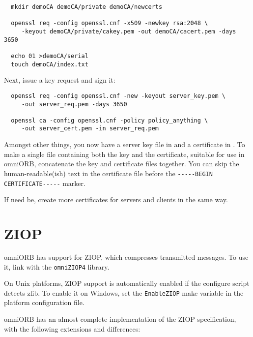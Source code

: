\documentclass[11pt,oneside,a4paper]{book}
\newcommand{\code}[1]{\texttt{#1}}
\begin{document}
\begin{verbatim}
  mkdir demoCA demoCA/private demoCA/newcerts

  openssl req -config openssl.cnf -x509 -newkey rsa:2048 \
     -keyout demoCA/private/cakey.pem -out demoCA/cacert.pem -days 3650

  echo 01 >demoCA/serial
  touch demoCA/index.txt
\end{verbatim}

\noindent Next, issue a key request and sign it:

\begin{verbatim}
  openssl req -config openssl.cnf -new -keyout server_key.pem \
     -out server_req.pem -days 3650

  openssl ca -config openssl.cnf -policy policy_anything \
     -out server_cert.pem -in server_req.pem 
\end{verbatim}

\noindent Amongst other things, you now have a server key file in
 and a certificate in . To
make a single file containing both the key and the certificate,
suitable for use in omniORB, concatenate the key and certificate files
together.  You can skip the human-readable(ish) text in the
certificate file before the \verb|-----BEGIN CERTIFICATE-----| marker.

If need be, create more certificates for servers and clients in the
same way.


\section{ZIOP}

omniORB has support for ZIOP, which compresses transmitted
messages. To use it, link with the \code{omniZIOP4} library.

On Unix platforms, ZIOP support is automatically enabled if the
configure script detects zlib. To enable it on Windows, set the
\code{EnableZIOP} make variable in the platform configuration file.

omniORB has an almost complete implementation of the ZIOP
specification, with the following extensions and differences:
\end{document}
